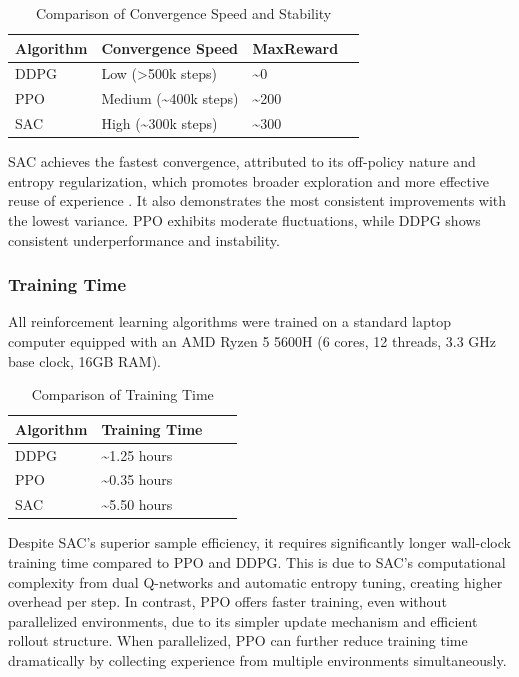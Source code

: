 \begin{table}[h]
\scriptsize
\centering
\begin{tabular}{@{}p{1.4cm}p{2.5cm}p{1.2cm}p{2.4cm}@{}}
\toprule
\textbf{Algorithm} & \textbf{Convergence Speed} & \textbf{MaxReward}\\
\midrule
\gls{DDPG} & Low (>500k steps)                  & \textasciitilde0\\
\gls{PPO}  & Medium (\textasciitilde400k steps) & \textasciitilde200\\
\gls{SAC}  & High (\textasciitilde300k steps)   & \textasciitilde300\\

\bottomrule
\end{tabular}
\caption{Comparison of Convergence Speed and Stability}
\end{table}

\noindent \gls{SAC} achieves the fastest convergence, attributed to its off-policy nature and entropy regularization, which promotes broader exploration and more effective reuse of experience \cite{haarnoja2018softactorcriticoffpolicymaximum}. It also demonstrates the most consistent improvements with the lowest variance. \gls{PPO} exhibits moderate fluctuations, while \gls{DDPG} shows consistent underperformance and instability.

\subsubsection{Training Time}

\noindent All reinforcement learning algorithms were trained on a standard laptop computer equipped with an AMD Ryzen 5 5600H (6 cores, 12 threads, 3.3 GHz base clock, 16GB RAM).\\

\begin{table}[h]
\scriptsize
\centering
\begin{tabular}{@{}p{1.4cm}p{2.5cm}p{1.2cm}p{2.4cm}@{}}
\toprule
\textbf{Algorithm} & \textbf{Training Time}\\
\midrule
\gls{DDPG} &  \textasciitilde1.25 hours\\
\gls{PPO}  &  \textasciitilde0.35 hours \\
\gls{SAC}  &  \textasciitilde5.50 hours\\
\bottomrule
\end{tabular}
\caption{Comparison of Training Time}
\end{table}

\noindent Despite \gls{SAC}'s superior sample efficiency, it requires significantly longer wall-clock training time compared to \gls{PPO} and \gls{DDPG}. This is due to \gls{SAC}'s computational complexity from dual Q-networks and automatic entropy tuning, creating higher overhead per step.  In contrast, PPO offers faster training, even without parallelized environments, due to its simpler update mechanism and efficient rollout structure. When parallelized, PPO can further reduce training time dramatically by collecting experience from multiple environments simultaneously. %

